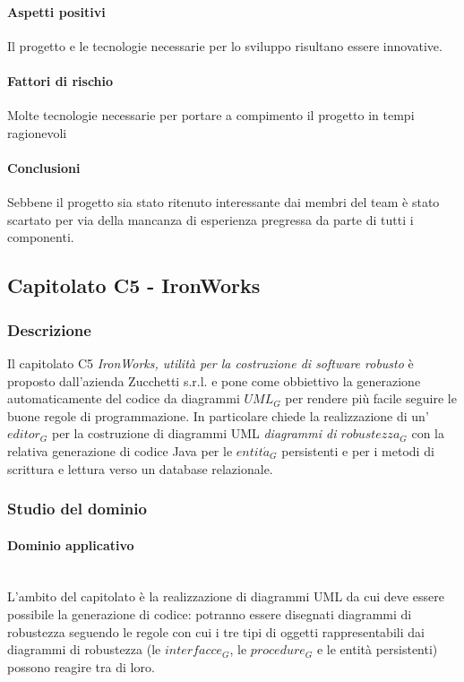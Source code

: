 	\paragraph{Aspetti positivi} \Spazio
	Il progetto e le tecnologie necessarie per lo sviluppo risultano essere innovative.
	\paragraph{Fattori di rischio} \Spazio
     Molte tecnologie necessarie per portare a compimento il progetto in tempi ragionevoli
	

	\paragraph{Conclusioni} \Spazio
	Sebbene il progetto sia stato ritenuto interessante dai membri del team è stato scartato per via della mancanza di esperienza pregressa da parte di tutti i componenti.
	
	\subsection{Capitolato C5 - IronWorks}
		\subsubsection{Descrizione}
		Il capitolato C5 \emph{IronWorks, utilità per la costruzione di software robusto} è proposto dall'azienda Zucchetti s.r.l. e pone come obbiettivo la generazione automaticamente del codice da diagrammi $UML_G$ per rendere più facile seguire le buone regole di programmazione. In particolare chiede la realizzazione di un'$editor_G$ per la costruzione di diagrammi UML \emph{diagrammi di $robustezza_G$} con la relativa generazione di codice Java per le $entit\acute a_G$ persistenti e per i metodi di scrittura e lettura verso un database relazionale. 
		\subsubsection{Studio del dominio}
			\paragraph{Dominio applicativo}
			\mbox{}\\
			L'ambito del capitolato è la realizzazione di diagrammi UML da cui deve essere possibile la generazione di codice: potranno essere disegnati diagrammi di robustezza seguendo le regole con cui i tre tipi di oggetti rappresentabili dai diagrammi di robustezza (le $interfacce_G$, le $procedure_G$ e le entità persistenti) possono reagire tra di loro.
